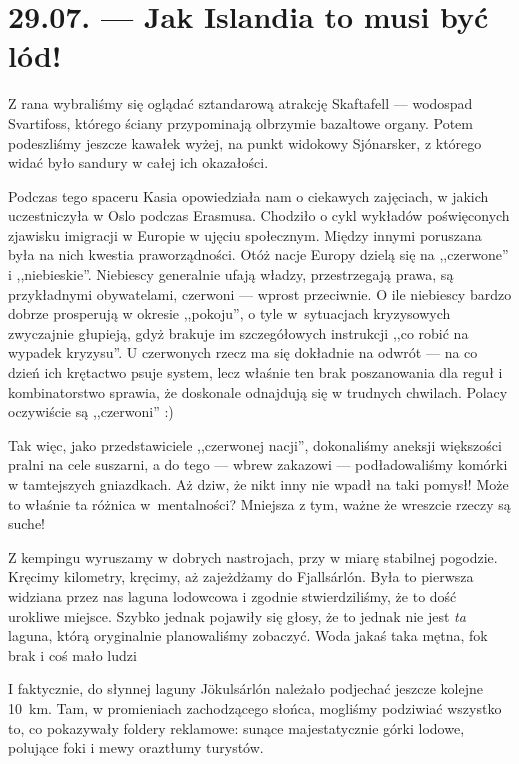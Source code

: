 \chapter*{29.07. --- Jak Islandia to musi być lód!}

Z rana wybraliśmy się oglądać sztandarową atrakcję Skaftafell --- wodospad Svartifoss, którego ściany przypominają olbrzymie bazaltowe organy. Potem podeszliśmy jeszcze kawałek wyżej, na punkt widokowy Sjónarsker, z którego widać było sandury w całej ich okazałości.

Podczas tego spaceru Kasia opowiedziała nam o ciekawych zajęciach, w jakich uczestniczyła w Oslo podczas Erasmusa. Chodziło o cykl wykładów poświęconych zjawisku imigracji w Europie w ujęciu społecznym. Między innymi poruszana była na nich kwestia praworządności. Otóż nacje Europy dzielą się na ,,czerwone'' i ,,niebieskie''. Niebiescy generalnie ufają władzy, przestrzegają prawa, są przykładnymi obywatelami, czerwoni --- wprost przeciwnie. O ile niebiescy bardzo dobrze prosperują w okresie ,,pokoju'', o tyle w~sytuacjach kryzysowych zwyczajnie głupieją, gdyż brakuje im szczegółowych instrukcji ,,co robić na wypadek kryzysu''. U czerwonych rzecz ma się dokładnie na odwrót --- na co dzień ich krętactwo psuje system, lecz właśnie ten brak poszanowania dla reguł i kombinatorstwo sprawia, że doskonale odnajdują się w trudnych chwilach. Polacy oczywiście są ,,czerwoni'' :)


Tak więc, jako przedstawiciele ,,czerwonej nacji'', dokonaliśmy aneksji większości pralni na cele suszarni, a do tego --- wbrew zakazowi --- podładowaliśmy komórki w tamtejszych gniazdkach. Aż dziw, że nikt inny nie wpadł na taki pomysł! Może to właśnie ta różnica w~mentalności? Mniejsza z tym, ważne że wreszcie rzeczy są suche!

Z kempingu wyruszamy w dobrych nastrojach, przy w miarę stabilnej pogodzie. Kręcimy kilometry, kręcimy, aż zajeżdżamy do Fjallsárlón. Była to pierwsza widziana przez nas laguna lodowcowa i zgodnie stwierdziliśmy, że to dość urokliwe miejsce. Szybko jednak pojawiły się głosy, że to jednak nie jest \emph{ta} laguna, którą oryginalnie planowaliśmy zobaczyć. Woda jakaś taka mętna, fok brak i coś mało ludzi\textellipsis

I faktycznie, do słynnej laguny Jökulsárlón należało podjechać jeszcze kolejne 10~km. Tam, w promieniach zachodzącego słońca, mogliśmy podziwiać wszystko to, co pokazywały foldery reklamowe: sunące majestatycznie górki lodowe, polujące foki i mewy oraz\textellipsis tłumy turystów.

